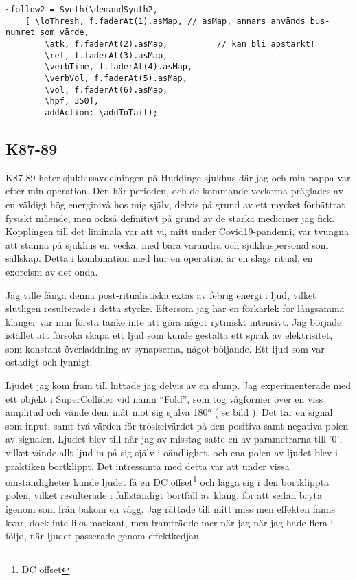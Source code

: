 \documentclass{article}
\renewcommand{\baselinestretch}{1.5}
\begin{document}
\renewcommand{\baselinestretch}{1}
\begin{lstlisting}[style=SuperCollider-IDE, caption=Syntens kontrollschema]
~follow2 = Synth(\demandSynth2, 
	[ \loThresh, f.faderAt(1).asMap, // asMap, annars används bus-numret som värde,
		\atk, f.faderAt(2).asMap,		   // kan bli apstarkt!
		\rel, f.faderAt(3).asMap,
		\verbTime, f.faderAt(4).asMap,
		\verbVol, f.faderAt(5).asMap,
		\vol, f.faderAt(6).asMap,
		\hpf, 350],
		addAction: \addToTail); 
\end{lstlisting}
\renewcommand{\baselinestretch}{1.5}

  \subsection{K87-89}
  K87-89 heter sjukhusavdelningen på Huddinge sjukhus där jag och min pappa var efter min operation. Den här
  perioden, och de kommande veckorna präglades av en väldigt hög energinivå hos mig själv, delvis på grund av
  ett mycket förbättrat fysiskt mående, men också definitivt på grund av de starka mediciner jag fick.
  Kopplingen till det liminala var att vi, mitt under Covid19-pandemi, var tvungna att stanna på sjukhus en
  vecka, med bara varandra och sjukhuspersonal som sällskap. Detta i kombination med hur en operation är en
  slags ritual, en exorcism av det onda. 

  Jag ville fånga denna post-ritualistiska extas av febrig energi i ljud, vilket slutligen resulterade i detta
  stycke. Eftersom jag har en förkärlek för långsamma klanger var min första tanke inte att göra något
  rytmiskt intensivt. Jag började istället att försöka skapa ett ljud som kunde gestalta ett sprak av
  elektrisitet, som konstant överladdning av synapserna, något böljande. Ett ljud som var ostadigt och
  lynnigt. 

  Ljudet jag kom fram till hittade jag delvis av en slump. Jag experimenterade med ett objekt i
  SuperCollider vid namn ``Fold'', som tog vågformer över en viss amplitud och vände dem inåt mot sig själva
  180° ( se bild ). Det tar en signal som input, samt två värden för tröskelvärdet på den positiva samt
  negativa polen av signalen. Ljudet blev till när jag av misstag satte en av parametrarna till '0', vilket
  vände allt ljud in på sig själv i oändlighet, och ena polen av ljudet blev i praktiken bortklippt. Det
  intressanta med detta var att under vissa omständigheter kunde ljudet få en DC offset\footnote{DC offset}
  och lägga sig i den bortklippta polen, vilket resulterade i fullständigt bortfall av klang, för att sedan
  bryta igenom som från bakom en vägg. Jag rättade till mitt miss men effekten fanns kvar, dock inte lika
  markant, men framträdde mer när jag när jag hade flera i följd, när ljudet passerade genom effektkedjan.
\end{document}
